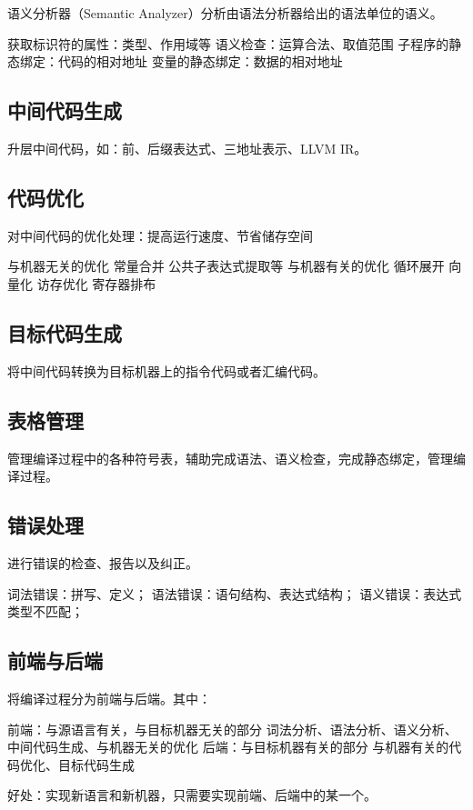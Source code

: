 \documentclass[oneside]{ctexbook}
\begin{document}
语义分析器（Semantic Analyzer）分析由语法分析器给出的语法单位的语义。
\begin{outline}
    \1 获取标识符的属性：类型、作用域等
    \1 语义检查：运算合法、取值范围
    \1 子程序的静态绑定：代码的相对地址
    \1 变量的静态绑定：数据的相对地址
\end{outline}

\subsection{中间代码生成}
升层中间代码，如：前、后缀表达式、三地址表示、LLVM IR。

\subsection{代码优化}
对中间代码的优化处理：提高运行速度、节省储存空间
\begin{outline}
    \1 与机器无关的优化
        \2 常量合并
        \2 公共子表达式提取等
    \1 与机器有关的优化
        \2 循环展开
        \2 向量化
        \2 访存优化
        \2 寄存器排布
\end{outline}

\subsection{目标代码生成}
将中间代码转换为目标机器上的指令代码或者汇编代码。

\subsection{表格管理}
管理编译过程中的各种符号表，辅助完成语法、语义检查，完成静态绑定，管理编译过程。

\subsection{错误处理}
进行错误的检查、报告以及纠正。

\begin{outline}
    \1 词法错误：拼写、定义；
    \1 语法错误：语句结构、表达式结构；
    \1 语义错误：表达式类型不匹配；
\end{outline}

\subsection{前端与后端}
将编译过程分为前端与后端。其中：
\begin{outline}
    \1 前端：与源语言有关，与目标机器无关的部分
        \2 词法分析、语法分析、语义分析、中间代码生成、与机器无关的优化
    \1 后端：与目标机器有关的部分
        \2 与机器有关的代码优化、目标代码生成
\end{outline}
好处：实现新语言和新机器，只需要实现前端、后端中的某一个。
\end{document}
